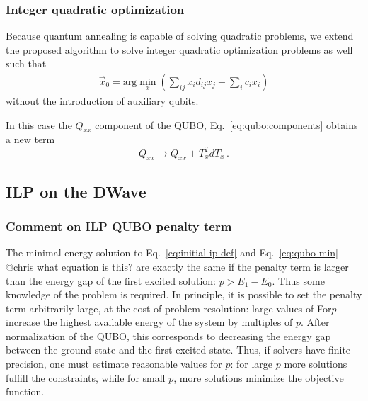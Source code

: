 \documentclass[prd,twocolumn,tightenlines,preprintnumbers,showpacs,superscriptaddress,notitlepage,nofootinbib,eqsecnum,floatfix,longbibliography,aps,10pt]{revtex4-2}
\begin{document}
\subsubsection{Integer quadratic optimization}
\label{sec:methods:ilp:quadratic}

Because quantum annealing is capable of solving quadratic problems, we extend the proposed algorithm to solve integer quadratic optimization problems as well such that
\begin{align}
 \vec x_0 = \mathrm{arg}\min\limits_{x}\left(\sum_{ij} x_i d_{ij} x_j + \sum_i c_i x_i\right)
\end{align}
without the introduction of auxiliary qubits.

In this case the $Q_{xx}$ component of the QUBO, Eq.~\eqref{eq:qubo:components} obtains a new term
\begin{equation}
    Q_{xx} \to Q_{xx} + T_x^T d T_x \, .
\end{equation}

\subsection{ILP on the DWave}
\label{sec:methods:ILP-on-DWave}

\subsubsection{Comment on ILP QUBO penalty term}
\label{sec:methods:ilp-qubo-comments}

The minimal energy solution to Eq.~\eqref{eq:initial-ip-def} and Eq.~\eqref{eq:qubo-min} {\color{red}@chris what equation is this?} are exactly the same if the penalty term is larger than the energy gap of the first excited solution: $p > E_1 - E_0$.
Thus some knowledge of the problem is required.
In principle, it is possible to set the penalty term arbitrarily large, at the cost of problem resolution: large values of For$p$ increase the highest available energy of the system by multiples of $p$.
After normalization of the QUBO, this corresponds to decreasing the energy gap between the ground state and the first excited state.
Thus, if solvers have finite precision, one must estimate reasonable values for $p$: for large $p$ more solutions fulfill the constraints, while for small $p$, more solutions minimize the objective function.
\end{document}

